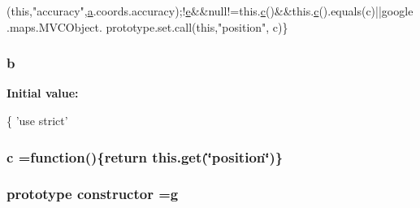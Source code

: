 \begin{DoxyCode}
      (\textcolor{keyword}{this},\textcolor{stringliteral}{"accuracy"},\hyperlink{packages_2bootstrap_83_83_86_2content_2_scripts_2bootstrap_8min_8js_ae8f6b400ed3390908c5cdeebed3a82b9}{a}.coords.accuracy);!\hyperlink{packages_2bootstrap_83_83_86_2content_2_scripts_2bootstrap_8min_8js_ab5902775854a8b8440bcd25e0fe1c120}{e}&&null!=this.\hyperlink{geolocation-marker_8js_a86bf90f74f091767cf1ae2e64e46fea2}{c}()&&this.\hyperlink{geolocation-marker_8js_a86bf90f74f091767cf1ae2e64e46fea2}{c}().equals(c)||google.maps.MVCObject.
      prototype.set.call(\textcolor{keyword}{this},\textcolor{stringliteral}{"position"},
c)\}
\end{DoxyCode}
\subsubsection[{\texorpdfstring{b}{b}}]{\setlength{\rightskip}{0pt plus 5cm}b}\hypertarget{geolocation-marker_8js_a21ad0bd836b90d08f4cf640b4c298e7c}{}\label{geolocation-marker_8js_a21ad0bd836b90d08f4cf640b4c298e7c}
{\bfseries Initial value\+:}
\begin{DoxyCode}
\{
\textcolor{stringliteral}{'use strict'}
\end{DoxyCode}
\subsubsection[{\texorpdfstring{c}{c}}]{ c =function()\{return {\bf this.\+get}(\char`\"{}position\char`\"{})\}}\hypertarget{geolocation-marker_8js_a86bf90f74f091767cf1ae2e64e46fea2}{}\label{geolocation-marker_8js_a86bf90f74f091767cf1ae2e64e46fea2}
\subsubsection[{\texorpdfstring{constructor}{constructor}}]{ {\bf prototype} constructor ={\bf g}}\hypertarget{geolocation-marker_8js_a8c65bdd1cf994e1dcc56d7732f16566a}{}\label{geolocation-marker_8js_a8c65bdd1cf994e1dcc56d7732f16566a}
